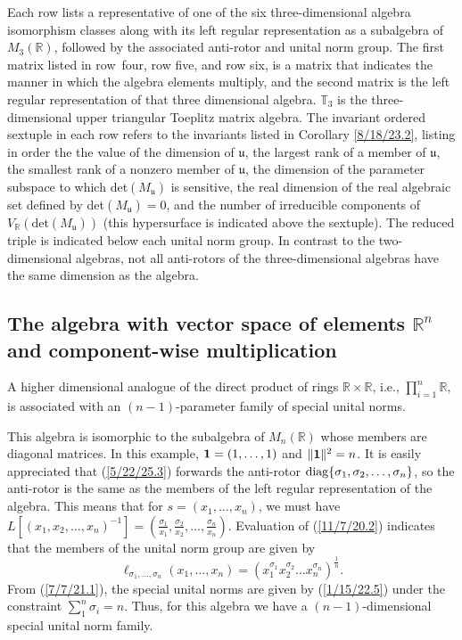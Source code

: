 \documentclass{amsart}
\theoremstyle{definition}
\numberwithin{theorem}{section}
\numberwithin{equation}{section}
\begin{document}
 {\small   
Each row lists a representative  of one of the six three-dimensional algebra isomorphism classes along with its left regular representation as a subalgebra of $M_3(\mathbb{R})$, followed by the associated anti-rotor and unital norm group. The first matrix listed in \mbox{row four}, row five, and row six, is a matrix that indicates the manner in which the algebra elements multiply, and the second matrix is the left regular representation of that three dimensional algebra.  $\mathbb{T}_3$ is the three-dimensional upper triangular Toeplitz matrix algebra. The invariant ordered sextuple in each row refers to the invariants listed in Corollary \ref{8/18/23.2}, listing in order the the value of the dimension of $\mathfrak{u}$, the largest rank of a member of $\mathfrak{u}$, the smallest rank of a nonzero member of $\mathfrak{u}$, the dimension of the parameter subspace to which det$(M_{\mathfrak{u}})$ is sensitive, the real dimension of the real algebraic set defined by det$(M_{\mathfrak{u}}) =0$, and the number of irreducible components of $V_\mathbb{R}(\text{det}(M_{\mathfrak{u}}))$ (this hypersurface is indicated above the sextuple).  The reduced triple is indicated below each unital norm group.  In contrast to the two-dimensional algebras, not all anti-rotors of the three-dimensional algebras have the same dimension as the algebra.}
 

\vfill
\hspace{0pt}
\pagebreak

 \subsection{The algebra with vector space of elements $\mathbb{R}^n$ and component-wise multiplication} A higher dimensional analogue of the direct product of rings \mbox{$\mathbb{R}\times \mathbb{R}$}, i.e., $\prod_{i=1}^n \mathbb{R}$, is associated with an $(n-1)$-parameter family of  special unital norms.

 This algebra is isomorphic to the subalgebra of $ M_n(\mathbb{R})$  whose members are diagonal matrices. In this example, ${\bf 1} = (1,\dots,1)$ and $\|{\bf 1}\|^2 = n$.   It is easily appreciated that (\ref{5/22/25.3}) forwards the anti-rotor ${\rm diag} \{ \sigma_1, \sigma_2,\dots,\sigma_n\}$, so the anti-rotor is the same as the members of the left regular representation of the algebra.  This means that for $s=(x_1,\dots,x_n)$, we must have $L[(x_1,x_2,\dots,x_n)^{-1}] = (\frac{\sigma_1}{x_1}, \frac{\sigma_2}{x_2},\dots,\frac{\sigma_n}{x_n})$.     Evaluation of (\ref{11/7/20.2}) indicates that the members of the unital norm group are given by  \begin{equation}\label{1/15/22.5} \ell_{\sigma_1,\dots,\sigma_n}(x_1,\dots,x_n) = (x_1^{\sigma_1} x_2^{\sigma_2} \dots x_n^{\sigma_n})^\frac{1}{n}. \end{equation} From (\ref{7/7/21.1}), the special unital norms are given by (\ref{1/15/22.5}) under the constraint $\sum_1^n \sigma_i = n$. Thus, for this algebra we have a $(n-1)$-dimensional special unital norm family.   
 
\end{document}
